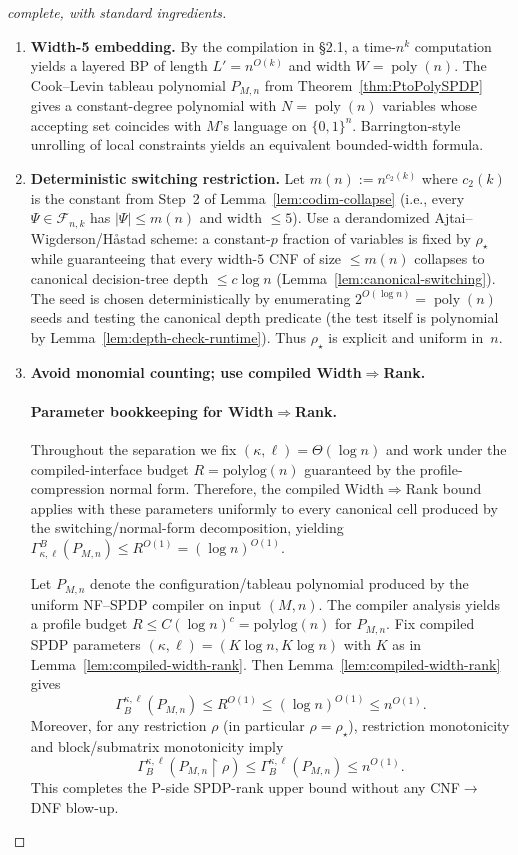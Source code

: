 \documentclass[12pt]{article}
\theoremstyle{definition}
\theoremstyle{definition}
\theoremstyle{remark}
\theoremstyle{remark}
\begin{document}
\begin{proof}[complete, with standard ingredients]
\begin{enumerate}
\item \textbf{Width-5 embedding.} By the compilation in \S2.1, a time-$n^k$ computation yields a layered BP of length $L'=n^{O(k)}$ and width $W=\operatorname{poly}(n)$. The Cook--Levin tableau polynomial $P_{M,n}$ from Theorem~\ref{thm:PtoPolySPDP} gives a constant-degree polynomial with $N=\operatorname{poly}(n)$ variables whose accepting set coincides with $M$'s language on $\{0,1\}^n$. Barrington-style unrolling of local constraints yields an equivalent bounded-width formula.

\item \textbf{Deterministic switching restriction.} Let $m(n) := n^{c_2(k)}$ where $c_2(k)$ is the constant from Step~2 of Lemma~\ref{lem:codim-collapse} (i.e., every $\Psi\in\mathcal{F}_{n,k}$ has $|\Psi|\le m(n)$ and width $\le 5$). Use a derandomized Ajtai--Wigderson/Håstad scheme: a constant-$p$ fraction of variables is fixed by $\rho_\star$ while guaranteeing that every width-$5$ CNF of size $\le m(n)$ collapses to canonical decision-tree depth $\le c\log n$ (Lemma~\ref{lem:canonical-switching}). The seed is chosen deterministically by enumerating $2^{O(\log n)}=\operatorname{poly}(n)$ seeds and testing the canonical depth predicate (the test itself is polynomial by Lemma~\ref{lem:depth-check-runtime}). Thus $\rho_\star$ is explicit and uniform in~$n$.

\item \textbf{Avoid monomial counting; use compiled Width$\Rightarrow$Rank.}

\paragraph{Parameter bookkeeping for Width$\Rightarrow$Rank.}
Throughout the separation we fix $(\kappa,\ell)=\Theta(\log n)$ and work under the
compiled-interface budget $R=\mathrm{polylog}(n)$ guaranteed by the profile-compression
normal form. Therefore, the compiled Width$\Rightarrow$Rank bound applies with these
parameters uniformly to every canonical cell produced by the switching/normal-form
decomposition, yielding $\Gamma^{B}_{\kappa,\ell}(P_{M,n}) \le R^{O(1)}=(\log n)^{O(1)}$.

Let $P_{M,n}$ denote the configuration/tableau polynomial produced by the uniform
NF--SPDP compiler on input $(M,n)$.
The compiler analysis yields a profile budget $R \le C(\log n)^c = \mathrm{polylog}(n)$ for $P_{M,n}$.
Fix compiled SPDP parameters $(\kappa,\ell)=(K\log n,K\log n)$ with $K$ as in
Lemma~\ref{lem:compiled-width-rank}.
Then Lemma~\ref{lem:compiled-width-rank} gives
\[
\Gamma^{\kappa,\ell}_B(P_{M,n}) \le R^{O(1)} \le (\log n)^{O(1)} \le n^{O(1)}.
\]
Moreover, for any restriction $\rho$ (in particular $\rho=\rho_\star$),
restriction monotonicity and block/submatrix monotonicity imply
\[
\Gamma^{\kappa,\ell}_B(P_{M,n}\upharpoonright \rho) \le \Gamma^{\kappa,\ell}_B(P_{M,n}) \le n^{O(1)}.
\]
This completes the P-side SPDP-rank upper bound without any CNF$\to$DNF blow-up.
\end{enumerate}
\end{proof}
\end{document}
